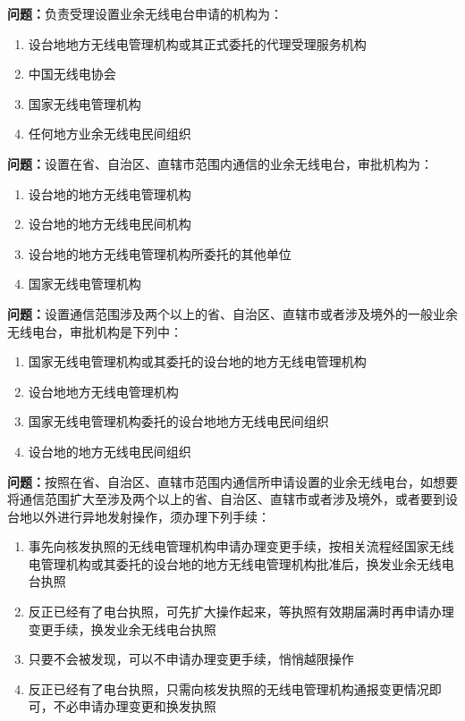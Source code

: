 \textbf{问题：}负责受理设置业余无线电台申请的机构为：
\begin{enumerate}[label=\Alph*), leftmargin=3em]
	\item 设台地地方无线电管理机构或其正式委托的代理受理服务机构
	\item 中国无线电协会
	\item 国家无线电管理机构
	\item 任何地方业余无线电民间组织
\end{enumerate}

\textbf{问题：}设置在省、自治区、直辖市范围内通信的业余无线电台，审批机构为：
\begin{enumerate}[label=\Alph*), leftmargin=3em]
	\item 设台地的地方无线电管理机构
	\item 设台地的地方无线电民间机构
	\item 设台地的地方无线电管理机构所委托的其他单位
	\item 国家无线电管理机构
\end{enumerate}

\textbf{问题：}设置通信范围涉及两个以上的省、自治区、直辖市或者涉及境外的一般业余无线电台，审批机构是下列中：
\begin{enumerate}[label=\Alph*), leftmargin=3em]
	\item 国家无线电管理机构或其委托的设台地的地方无线电管理机构
	\item 设台地地方无线电管理机构
	\item 国家无线电管理机构委托的设台地地方无线电民间组织
	\item 设台地的地方无线电民间组织
\end{enumerate}

\textbf{问题：}按照在省、自治区、直辖市范围内通信所申请设置的业余无线电台，如想要将通信范围扩大至涉及两个以上的省、自治区、直辖市或者涉及境外，或者要到设台地以外进行异地发射操作，须办理下列手续：
\begin{enumerate}[label=\Alph*), leftmargin=3em]
	\item 事先向核发执照的无线电管理机构申请办理变更手续，按相关流程经国家无线电管理机构或其委托的设台地的地方无线电管理机构批准后，换发业余无线电台执照
	\item 反正已经有了电台执照，可先扩大操作起来，等执照有效期届满时再申请办理变更手续，换发业余无线电台执照
	\item 只要不会被发现，可以不申请办理变更手续，悄悄越限操作
	\item 反正已经有了电台执照，只需向核发执照的无线电管理机构通报变更情况即可，不必申请办理变更和换发执照
\end{enumerate}

